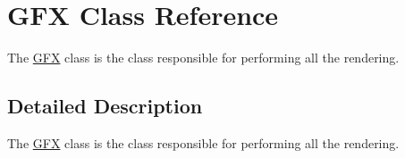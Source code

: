 \hypertarget{class_g_f_x}{\section{G\-F\-X Class Reference}
\label{class_g_f_x}
}


The \hyperlink{class_g_f_x}{G\-F\-X} class is the class responsible for performing all the rendering.  




\subsection{Detailed Description}
The \hyperlink{class_g_f_x}{G\-F\-X} class is the class responsible for performing all the rendering. 